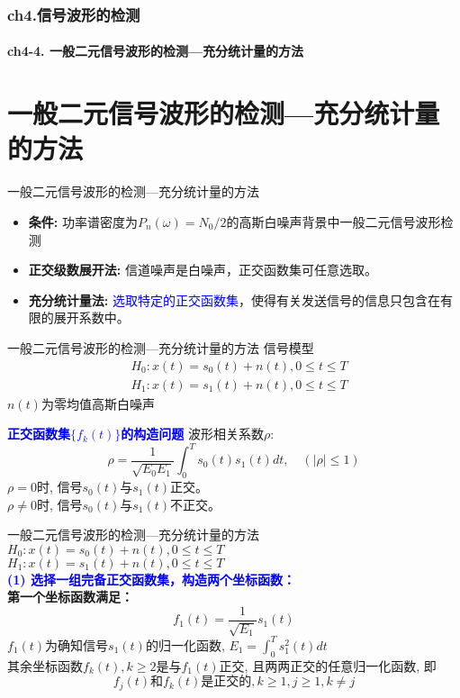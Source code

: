 \begin{frame}[shrink]
  \frametitle{ch4.信号波形的检测}
  \framesubtitle{ch4-4. 一般二元信号波形的检测---充分统计量的方法}
  \tableofcontents[hideallsubsections]
\end{frame}

\section{一般二元信号波形的检测---充分统计量的方法}

\begin{frame}{一般二元信号波形的检测---充分统计量的方法}
\begin{itemize}
	\setlength{\itemsep}{.5cm}
	\item \textbf{条件: }功率谱密度为$P_n(\omega)=N_0/2$的高斯白噪声背景中一般二元信号波形检测
	\item \textbf{正交级数展开法: }信道噪声是白噪声，正交函数集可任意选取。
	\item \textbf{充分统计量法: }\textcolor{blue}{选取特定的正交函数集}，使得有关发送信号的信息只包含在有限的展开系数中。	
\end{itemize}
\end{frame}

\begin{frame}{一般二元信号波形的检测---充分统计量的方法}
信号模型
\begin{align*}
&H_0: x(t)=s_0(t)+n(t), 0\le t\le T\\
&H_1: x(t)=s_1(t)+n(t), 0\le t\le T
\end{align*}
$n(t)$为零均值高斯白噪声
\begin{block}{\textbf{\textcolor{blue}{正交函数集$\{f_k(t)\}$的构造问题}}}
波形相关系数$\rho$:
\[ \rho=\frac{1}{\sqrt{E_{0}E_{1}}}\int_{0}^{T}s_0(t)s_1(t)dt,\quad(|\rho|\le 1) \]
$\rho =0$时, 信号$s_0(t)$与$s_1(t)$正交。\\
$\rho\ne 0$时, 信号$s_0(t)$与$s_1(t)$不正交。	
\end{block}
\end{frame}

\begin{frame}{一般二元信号波形的检测---充分统计量的方法}
$H_0: x(t)=s_0(t)+n(t), 0\le t\le T$\\
$H_1: x(t)=s_1(t)+n(t), 0\le t\le T$\\
\textbf{\textcolor{blue}{(1) 选择一组完备正交函数集，构造两个坐标函数：}}\\
\textbf{第一个坐标函数满足：}\\
\[f_1(t)=\frac{1}{\sqrt{E_1}}s_1(t)\]
$f_1(t)$为确知信号$s_1(t)$的归一化函数, $E_1=\int_{0}^{T}s_1^2(t)dt$\\
其余坐标函数$f_k(t), k\ge 2$是与$f_1(t)$正交, 且两两正交的任意归一化函数, 即
\[f_j(t)\text{和}f_k(t)\text{是正交的}, k\ge 1, j\ge 1, k\ne j \]
\end{frame}

